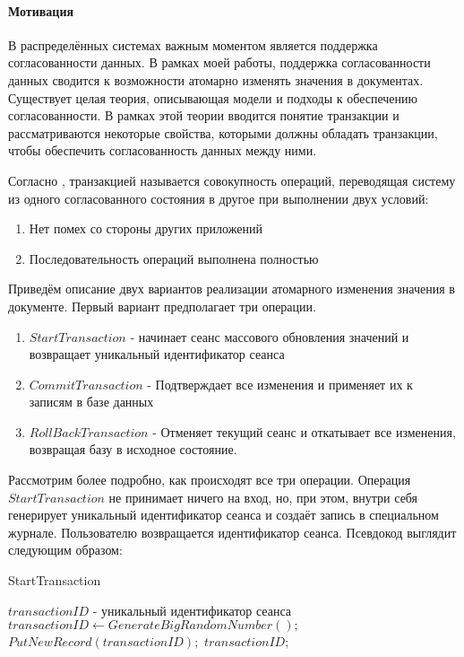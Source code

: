 \documentclass{matmex-diploma}
\begin{document}
        \paragraph{Мотивация} В распределённых системах важным моментом является поддержка согласованности данных. В рамках моей работы, поддержка согласованности данных сводится к возможности атомарно изменять значения в документах. Существует целая теория, описывающая модели и подходы к обеспечению согласованности. В рамках этой теории вводится понятие транзакции и рассматриваются некоторые свойства, которыми должны обладать транзакции, чтобы обеспечить согласованность данных между ними. 
        
        Согласно \cite{novikov}, транзакцией называется совокупность операций, переводящая систему из одного согласованного состояния в другое при выполнении двух условий:
        \begin{enumerate}
            \item Нет помех со стороны других приложений
            \item Последовательность операций выполнена полностью
        \end{enumerate}
        
        Приведём описание двух вариантов реализации атомарного изменения значения в документе. Первый вариант предполагает три операции.
        \begin{enumerate}
            \item $StartTransaction$ - начинает сеанс массового обновления значений и возвращает уникальный идентификатор сеанса 
            \item $CommitTransaction$ - Подтверждает все изменения и применяет их к записям в базе данных
            \item $RollBackTransaction$ - Отменяет текущий сеанс и откатывает все изменения, возвращая базу в исходное состояние.
        \end{enumerate}    
        Рассмотрим более подробно, как происходят все три операции. Операция $StartTransaction$ не принимает ничего на вход, но, при этом, внутри себя генерирует уникальный идентификатор сеанса и создаёт запись в специальном журнале. Пользователю возвращается идентификатор сеанса. Псевдокод выглядит следующим образом:
            
        \begin{algorithm}[H]                   
        \caption{StartTransaction}              
        \label{startTran1}                        
            \begin{algorithmic}        
                \ENSURE $transactionID$ - уникальный идентификатор сеанса
                \STATE $transactionID \leftarrow GenerateBigRandomNumber();$
                \STATE $PutNewRecord(transactionID);$
                \RETURN $transactionID;$
            \end{algorithmic}
        \end{algorithm}
        
\end{document}
